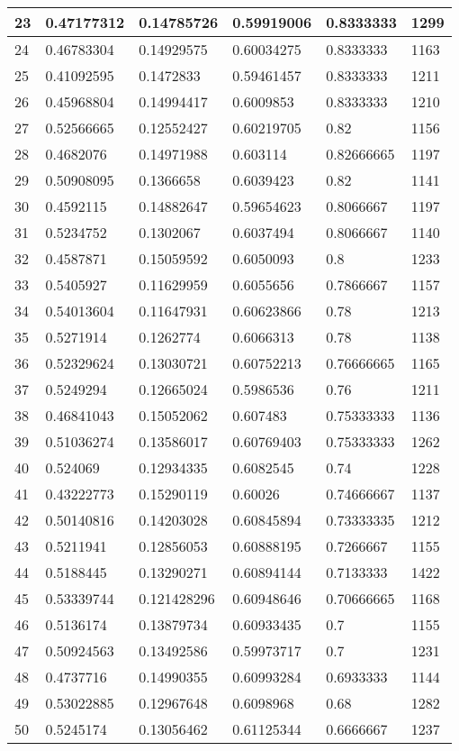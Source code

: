 \begin{longtable}{|l|l|l|l|l|l|}
23 & 0.47177312 & 0.14785726 & 0.59919006 & 0.8333333 & 1299 \\ \hline 
24 & 0.46783304 & 0.14929575 & 0.60034275 & 0.8333333 & 1163 \\ \hline 
25 & 0.41092595 & 0.1472833 & 0.59461457 & 0.8333333 & 1211 \\ \hline 
26 & 0.45968804 & 0.14994417 & 0.6009853 & 0.8333333 & 1210 \\ \hline 
27 & 0.52566665 & 0.12552427 & 0.60219705 & 0.82 & 1156 \\ \hline 
28 & 0.4682076 & 0.14971988 & 0.603114 & 0.82666665 & 1197 \\ \hline 
29 & 0.50908095 & 0.1366658 & 0.6039423 & 0.82 & 1141 \\ \hline 
30 & 0.4592115 & 0.14882647 & 0.59654623 & 0.8066667 & 1197 \\ \hline 
31 & 0.5234752 & 0.1302067 & 0.6037494 & 0.8066667 & 1140 \\ \hline 
32 & 0.4587871 & 0.15059592 & 0.6050093 & 0.8 & 1233 \\ \hline 
33 & 0.5405927 & 0.11629959 & 0.6055656 & 0.7866667 & 1157 \\ \hline 
34 & 0.54013604 & 0.11647931 & 0.60623866 & 0.78 & 1213 \\ \hline 
35 & 0.5271914 & 0.1262774 & 0.6066313 & 0.78 & 1138 \\ \hline 
36 & 0.52329624 & 0.13030721 & 0.60752213 & 0.76666665 & 1165 \\ \hline 
37 & 0.5249294 & 0.12665024 & 0.5986536 & 0.76 & 1211 \\ \hline 
38 & 0.46841043 & 0.15052062 & 0.607483 & 0.75333333 & 1136 \\ \hline 
39 & 0.51036274 & 0.13586017 & 0.60769403 & 0.75333333 & 1262 \\ \hline 
40 & 0.524069 & 0.12934335 & 0.6082545 & 0.74 & 1228 \\ \hline 
41 & 0.43222773 & 0.15290119 & 0.60026 & 0.74666667 & 1137 \\ \hline 
42 & 0.50140816 & 0.14203028 & 0.60845894 & 0.73333335 & 1212 \\ \hline 
43 & 0.5211941 & 0.12856053 & 0.60888195 & 0.7266667 & 1155 \\ \hline 
44 & 0.5188445 & 0.13290271 & 0.60894144 & 0.7133333 & 1422 \\ \hline 
45 & 0.53339744 & 0.121428296 & 0.60948646 & 0.70666665 & 1168 \\ \hline 
46 & 0.5136174 & 0.13879734 & 0.60933435 & 0.7 & 1155 \\ \hline 
47 & 0.50924563 & 0.13492586 & 0.59973717 & 0.7 & 1231 \\ \hline 
48 & 0.4737716 & 0.14990355 & 0.60993284 & 0.6933333 & 1144 \\ \hline 
49 & 0.53022885 & 0.12967648 & 0.6098968 & 0.68 & 1282 \\ \hline 
50 & 0.5245174 & 0.13056462 & 0.61125344 & 0.6666667 & 1237 \\ \hline 
\end{longtable}